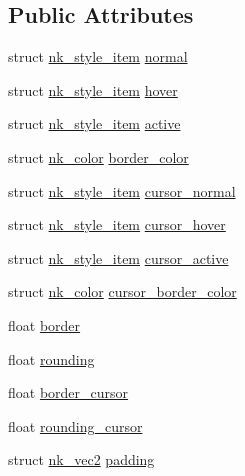 \subsection*{Public Attributes}
\begin{DoxyCompactItemize}
\item 
struct \mbox{\hyperlink{structnk__style__item}{nk\+\_\+style\+\_\+item}} \mbox{\hyperlink{structnk__style__scrollbar_a381f8388c9dd0aaf9c4c249f4d7320b6}{normal}}
\item 
struct \mbox{\hyperlink{structnk__style__item}{nk\+\_\+style\+\_\+item}} \mbox{\hyperlink{structnk__style__scrollbar_a5059aac4c32afa1a127f02f6b465b90c}{hover}}
\item 
struct \mbox{\hyperlink{structnk__style__item}{nk\+\_\+style\+\_\+item}} \mbox{\hyperlink{structnk__style__scrollbar_a9573ba744345893dca5cc83e0114dad5}{active}}
\item 
struct \mbox{\hyperlink{structnk__color}{nk\+\_\+color}} \mbox{\hyperlink{structnk__style__scrollbar_ad6489946e15dc9627a51673de29aea5d}{border\+\_\+color}}
\item 
struct \mbox{\hyperlink{structnk__style__item}{nk\+\_\+style\+\_\+item}} \mbox{\hyperlink{structnk__style__scrollbar_a62eefaabe4c7278fa367bfdab06d06a9}{cursor\+\_\+normal}}
\item 
struct \mbox{\hyperlink{structnk__style__item}{nk\+\_\+style\+\_\+item}} \mbox{\hyperlink{structnk__style__scrollbar_a6ad3a42ce7f9fc7277b0ee17eb48cd6c}{cursor\+\_\+hover}}
\item 
struct \mbox{\hyperlink{structnk__style__item}{nk\+\_\+style\+\_\+item}} \mbox{\hyperlink{structnk__style__scrollbar_a97b096336f28303c20aec3e9443bda75}{cursor\+\_\+active}}
\item 
struct \mbox{\hyperlink{structnk__color}{nk\+\_\+color}} \mbox{\hyperlink{structnk__style__scrollbar_a7bfa13e0e337fcbb9c8c48b4d244d774}{cursor\+\_\+border\+\_\+color}}
\item 
float \mbox{\hyperlink{structnk__style__scrollbar_a4ad9da720a06076e1e945cd020d72974}{border}}
\item 
float \mbox{\hyperlink{structnk__style__scrollbar_a654d88e47b733ddddac7f2cd555d06e1}{rounding}}
\item 
float \mbox{\hyperlink{structnk__style__scrollbar_a9b2f17f53a795487e099887747ab071a}{border\+\_\+cursor}}
\item 
float \mbox{\hyperlink{structnk__style__scrollbar_a85338ec19a8d87922f6f56244eccc2d2}{rounding\+\_\+cursor}}
\item 
struct \mbox{\hyperlink{structnk__vec2}{nk\+\_\+vec2}} \mbox{\hyperlink{structnk__style__scrollbar_a3ad5ac59291c57e8cea5fc88028e0c6c}{padding}}

\end{DoxyCompactItemize}
